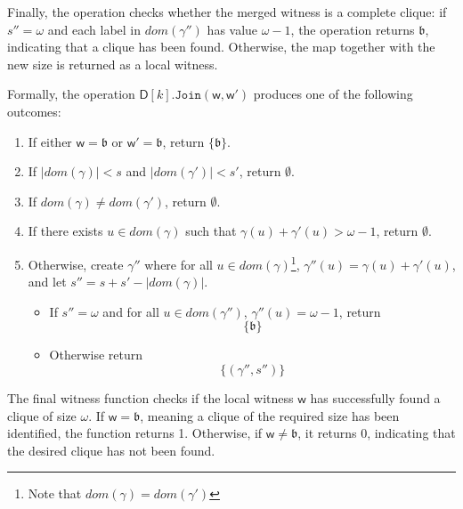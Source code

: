 \documentclass[11pt,a4paper]{article}
\newcommand{\treewidthvalue}{k}
\newcommand{\joingenericcore}{\mathtt{Join}}
\newcommand{\vertexone}{u}
\newcommand{\awitness}{\mathsf{w}}
\newcommand{\dpcore}{\mathsf{D}}
\newcommand{\domain}{dom}
\newcommand{\cliqueparameter}{\omega}
\newcommand{\cliquemap}{\gamma}
\newcommand{\cliquesize}{s}
\newcommand{\cliquefound}{\mathfrak{b}}
\begin{document}
{		Finally, the operation checks whether the merged witness is a complete clique: if $\cliquesize''=\cliqueparameter$ and each label in $\domain(\cliquemap'')$ has value $\cliqueparameter-1$, the operation returns $\cliquefound$, indicating that a clique has been found. Otherwise, the map together with the new size is returned as a local witness.

	Formally, the operation $\dpcore[\treewidthvalue].\joingenericcore(\awitness, \awitness')$ produces one of the following outcomes:

	\begin{enumerate}
	\item If either $\awitness = \cliquefound$ or $\awitness' = \cliquefound$, return $\{\cliquefound\}$.
	\item If $|\domain(\cliquemap)| < \cliquesize$ and $|\domain(\cliquemap')| < \cliquesize'$, return $\emptyset$.
	\item If $\domain(\cliquemap)\neq \domain(\cliquemap')$, return $\emptyset$.
		\item If there exists $\vertexone\in\domain(\cliquemap)$ such that
		$\cliquemap(\vertexone)+\cliquemap'(\vertexone)>\cliqueparameter-1$, return $\emptyset$.
		\item Otherwise, create $\cliquemap''$ where for all $\vertexone \in \domain(\cliquemap)$\footnote{Note that $\domain(\cliquemap) = \domain(\cliquemap')$}, $\cliquemap''(\vertexone) = \cliquemap(\vertexone) + \cliquemap'(\vertexone)$, and let $\cliquesize'' = \cliquesize + \cliquesize' - |\domain(\cliquemap)|$.

		\begin{itemize}
		\item If $\cliquesize''=\cliqueparameter$ and for all $\vertexone \in \domain(\cliquemap'')$, $\cliquemap''(\vertexone) = \cliqueparameter -1 $, return
		\[\{\cliquefound\}\]
		\item Otherwise return
		\[\{(\cliquemap'',\cliquesize'')\}\]
	\end{itemize}
	\end{enumerate}

	 The final witness function checks if the local witness \(\awitness\) has successfully found a clique of size \(\cliqueparameter\). If \(\awitness = \cliquefound \), meaning a clique of the required size has been identified, the function returns 1. Otherwise, if \(\awitness \neq \cliquefound\), it returns 0, indicating that the desired clique has not been found.


}
\end{document}
